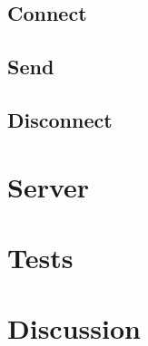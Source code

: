 \documentclass{article}
\begin{document}
\subsection{Connect}

\subsection{Send}
\subsection{Disconnect}


\section{Server}

\section{Tests}

\section{Discussion}
\end{document}
